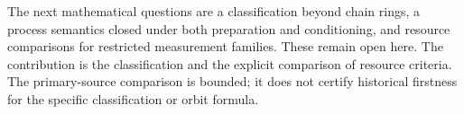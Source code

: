 \documentclass[11pt]{article}
\theoremstyle{definition}\newtheorem{definition}[theorem]{Definition}
\theoremstyle{remark}\newtheorem{remark}[theorem]{Remark}
\begin{document}
The next mathematical questions are a classification beyond chain rings, a process semantics closed under both preparation and conditioning, and resource comparisons for restricted measurement families. These remain open here. The contribution is the classification and the explicit comparison of resource criteria. The primary-source comparison is bounded; it does not certify historical firstness for the specific classification or orbit formula.



\end{document}
